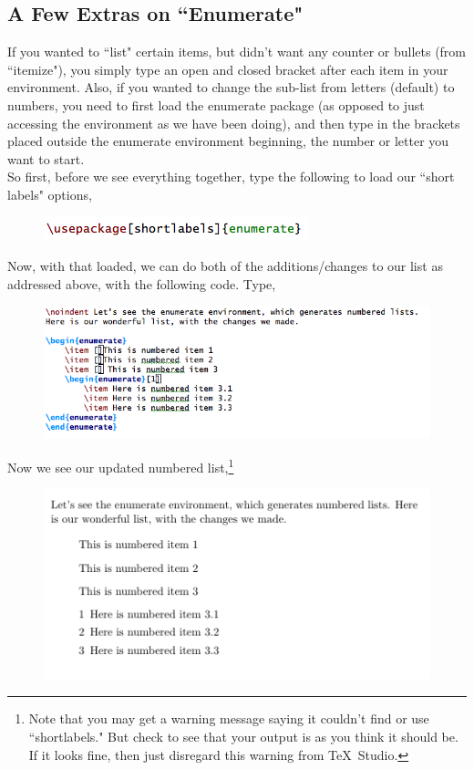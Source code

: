 \documentclass[11pt]{article}
\newcommand{\forceindent}{\leavevmode{\parindent=1.5em\indent}} %
\begin{document}
\subsection{A Few Extras on ``Enumerate"}

\forceindent If you wanted to ``list" certain items, but didn't want any counter or bullets (from ``itemize"), you simply type an open and closed bracket after each item in your environment. Also, if you wanted to change the sub-list from letters (default) to numbers, you need to first load the enumerate package (as opposed to just accessing the environment as we have been doing), and then type in the brackets placed outside the enumerate environment beginning, the number or letter you want to start. \\

So first, before we see everything together, type the following to load our ``short labels" options,

\begin{figure}[!h]
	\includegraphics[scale=.6]{CODE12} \\
	\centering
\end{figure}

Now, with that loaded, we can do both of the additions/changes to our list as addressed above, with the following code. Type,

\begin{figure}[!h]
	\includegraphics[scale=.6]{CODE13} \\
	\centering
\end{figure}

Now we see our updated numbered list,\footnote{Note that you may get a warning message saying it couldn't find or use ``shortlabels." But check to see that your output is as you think it should be. If it looks fine, then just disregard this warning from \TeX\ Studio.} \\

\begin{figure}[!h]
	\includegraphics[scale=.6]{OUT13} \\
	\centering
\end{figure}
\end{document}
